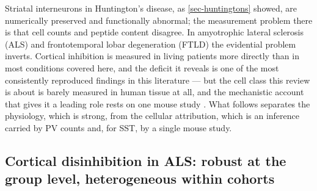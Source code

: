 \documentclass[11pt]{article}
\begin{document}
Striatal interneurons in Huntington's disease, as \ref{sec-huntingtons} showed, are numerically preserved and functionally abnormal; the measurement problem there is that cell counts and peptide content disagree. In amyotrophic lateral sclerosis (ALS) and frontotemporal lobar degeneration (FTLD) the evidential problem inverts. Cortical inhibition is measured in living patients more directly than in most conditions covered here, and the deficit it reveals is one of the most consistently reproduced findings in this literature \citep{Higashihara2024,VanDenBos2024} --- but the cell class this review is about is barely measured in human tissue at all, and the mechanistic account that gives it a leading role rests on one mouse study \citep{Zhang2016}. What follows separates the physiology, which is strong, from the cellular attribution, which is an inference carried by PV counts and, for SST, by a single mouse study.

\subsection{Cortical disinhibition in ALS: robust at the group level, heterogeneous within cohorts}
\label{sec-07-als-disinhibition}
\end{document}
